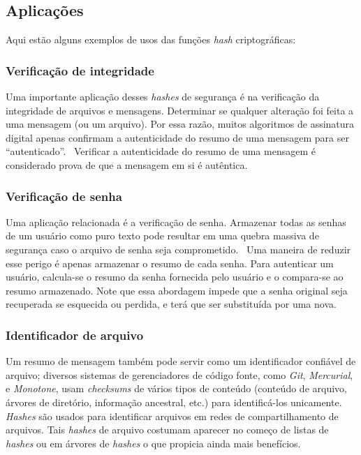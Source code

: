 \subsection{Aplicações}

Aqui estão alguns exemplos de usos das funções \textit{hash} criptográficas:

\subsubsection{Verificação de integridade}

Uma importante aplicação desses \textit{hashes} de segurança é na verificação da integridade de arquivos e mensagens.
Determinar se qualquer alteração foi feita a uma mensagem (ou um arquivo).
Por essa razão, muitos algoritmos de assinatura digital apenas confirmam a autenticidade do resumo de uma mensagem para ser ``autenticado''.~\cite{wiki:hashapp1}
Verificar a autenticidade do resumo de uma mensagem é considerado prova de que a mensagem em si é autêntica.

\subsubsection{Verificação de senha}

Uma aplicação relacionada é a verificação de senha.
Armazenar todas as senhas de um usuário como puro texto pode resultar em uma quebra massiva de segurança caso o arquivo de senha seja comprometido.~\cite{wiki:hashapp2}
Uma maneira de reduzir esse perigo é apenas armazenar o resumo de cada senha.
Para autenticar um usuário, calcula-se o resumo da senha fornecida pelo usuário e o compara-se ao resumo armazenado.
Note que essa abordagem impede que a senha original seja recuperada se esquecida ou perdida, e terá que ser substituída por uma nova.

\subsubsection{Identificador de arquivo}

Um resumo de mensagem também pode servir como um identificador confiável de arquivo; diversos sistemas de gerenciadores de código fonte, como \textit{Git}, \textit{Mercurial}, e \textit{Monotone}, usam \textit{checksums} de vários tipos de conteúdo (conteúdo de arquivo, árvores de diretório, informação ancestral, etc.) para identificá-los unicamente.~\cite{wiki:hashapp3}
\textit{Hashes} são usados para identificar arquivos em redes de compartilhamento de arquivos.
Tais \textit{hashes} de arquivo costumam aparecer no começo de listas de \textit{hashes} ou em árvores de \textit{hashes} o que propicia ainda mais benefícios.

